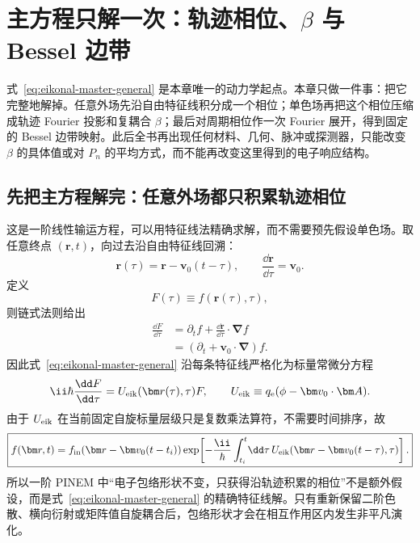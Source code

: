 \chapter{主方程只解一次：轨迹相位、$\beta$ 与 Bessel 边带}
\label{chap:pinem-core}

式~\eqref{eq:eikonal-master-general} 是本章唯一的动力学起点。本章只做一件事：把它完整地解掉。任意外场先沿自由特征线积分成一个相位；单色场再把这个相位压缩成轨迹 Fourier 投影和复耦合 \(\beta\)；最后对周期相位作一次 Fourier 展开，得到固定的 Bessel 边带映射。此后全书再出现任何材料、几何、脉冲或探测器，只能改变 \(\beta\) 的具体值或对 \(P_n\) 的平均方式，而不能再改变这里得到的电子响应结构。

\section{先把主方程解完：任意外场都只积累轨迹相位}

这是一阶线性输运方程，可以用特征线法精确求解，而不需要预先假设单色场。取任意终点 $(\bm r,t)$，向过去沿自由特征线回溯：
\begin{equation}
 \bm r(\tau)=\bm r-\bm v_0(t-\tau),
 \qquad
 \frac{\dd\bm r}{\dd\tau}=\bm v_0.
 \label{eq:characteristic-curve}
\end{equation}
定义
\begin{equation}
 F(\tau)\equiv f(\bm r(\tau),\tau),
\end{equation}
则链式法则给出
\begin{align}
 \frac{\dd F}{\dd\tau}
 &=\partial_t f
 +\frac{\dd\bm r}{\dd\tau}\cdot\bm\nabla f\\
 &=\left(\partial_t+\bm v_0\cdot\bm\nabla\right)f.
\end{align}
因此式~\eqref{eq:eikonal-master-general} 沿每条特征线严格化为标量常微分方程
\begin{equation}
 \ii\hbar\frac{\dd F}{\dd\tau}
 =U_{\rm eik}(\bm r(\tau),\tau)F,
 \qquad
 U_{\rm eik}\equiv q_{\rm e}(\phi-\bm v_0\cdot\bm A).
 \label{eq:characteristic-ode}
\end{equation}
由于 $U_{\rm eik}$ 在当前固定自旋标量层级只是复数乘法算符，不需要时间排序，故
\begin{equation}
 \boxed{
 f(\bm r,t)=
 f_{\rm in}\!\left(\bm r-\bm v_0(t-t_i)\right)
 \exp\!\left[
 -\frac{\ii}{\hbar}
 \int_{t_i}^{t}\!\dd\tau\,
 U_{\rm eik}\!\left(\bm r-\bm v_0(t-\tau),\tau\right)
 \right].}
 \label{eq:characteristic-exact-solution}
\end{equation}
所以一阶 PINEM 中“电子包络形状不变，只获得沿轨迹积累的相位”不是额外假设，而是式~\eqref{eq:eikonal-master-general} 的精确特征线解。只有重新保留二阶色散、横向衍射或矩阵值自旋耦合后，包络形状才会在相互作用区内发生非平凡演化。

